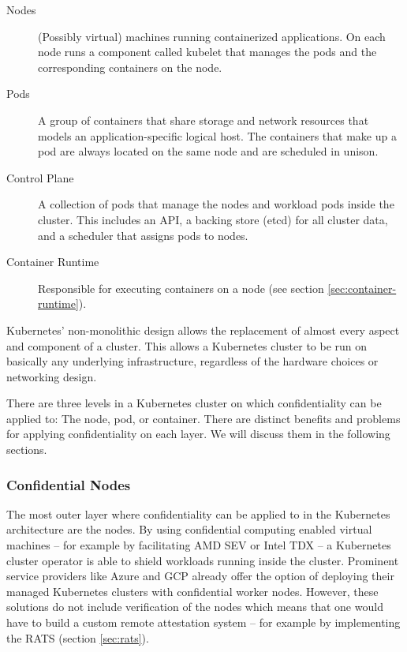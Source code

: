 \begin{description}
  \item[Nodes]
    (Possibly virtual) machines running containerized applications. On each node
    runs a component called kubelet that manages the pods and the corresponding
    containers on the node.
  \item[Pods]
    A group of containers that share storage and network resources that models
    an application-specific logical host. The containers that make up a pod are
    always located on the same node and are scheduled in unison.
  \item[Control Plane]
    A collection of pods that manage the nodes and workload pods inside the
    cluster. This includes an API, a backing store (etcd) for all cluster data,
    and a scheduler that assigns pods to nodes.
  \item[Container Runtime]
    Responsible for executing containers on a node (see section
    \ref{sec:container-runtime}).
\end{description}


Kubernetes' non-monolithic design allows the replacement of almost every aspect
and component of a cluster. This allows a Kubernetes cluster to be run on
basically any underlying infrastructure, regardless of the hardware choices or
networking design.

There are three levels in a Kubernetes cluster on which confidentiality can be
applied to: The node, pod, or container. There are distinct benefits and
problems for applying confidentiality on each layer. We will discuss them in the
following sections.

\subsubsection{Confidential Nodes}

The most outer layer where confidentiality can be applied to in the Kubernetes
architecture are the nodes. By using confidential computing enabled virtual
machines -- for example by facilitating AMD SEV or Intel TDX -- a Kubernetes
cluster operator is able to shield workloads running inside the cluster.
Prominent service providers like Azure and GCP already offer the option of
deploying their managed Kubernetes clusters with confidential worker nodes.
However, these solutions do not include verification of the nodes which means
that one would have to build a custom remote attestation system -- for example
by implementing the RATS (section \ref{sec:rats}).

